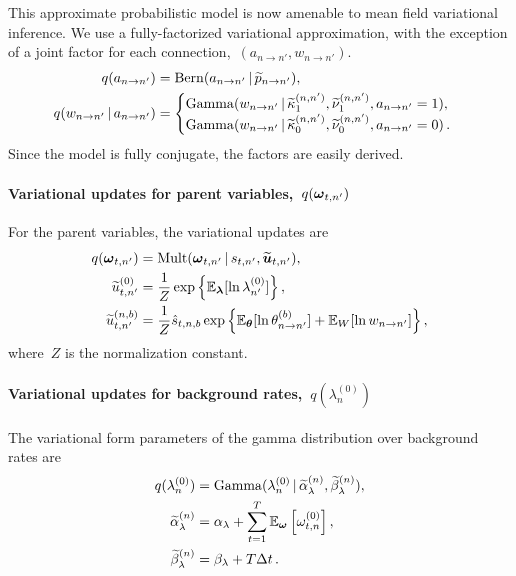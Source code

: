 This approximate probabilistic model is now amenable to mean field
variational inference. We use a fully-factorized variational
approximation, with the exception of a joint factor for each
connection,~${(a_{n\to n'},w_{n \to n'})}$.
\begin{align*}
  q(a_{n \to n'}) &= \mathrm{Bern}(a_{n \to n'} \,|\, \widetilde{p}_{n \to n'}), \\
  q(w_{n \to n'} \,|\, a_{n \to n'}) &=
  \begin{cases} 
    \mathrm{Gamma}(w_{n \to n'} \,|\, \widetilde{\kappa}_1^{(n, n')}, \widetilde{\nu}_1^{(n,n')}, a_{n \to n'} =1), \\
    \mathrm{Gamma}(w_{n \to n'} \,|\, \widetilde{\kappa}_0^{(n, n')}, \widetilde{\nu}_0^{(n, n')}, a_{n \to n'} =0)\,.
  \end{cases}
\end{align*}
Since the model is fully conjugate, the factors are easily derived.

\paragraph{Variational updates for parent variables,~$q(\boldsymbol{\omega}_{t, n'})$} 
For the parent variables, the variational updates are
\begin{align*}
q(\boldsymbol{\omega}_{t,n'}) &= \mathrm{Mult}(\boldsymbol{\omega}_{t, n'} \,|\, s_{t,n'}, \widetilde{\boldsymbol{u}}_{t,n'}), \\
\widetilde{u}_{t,n'}^{(0)} &= \frac{1}{Z} \exp\left\{\mathbb{E}_{\boldsymbol{\lambda}}[\ln \lambda_{n'}^{(0)}]\right\}, \\
\widetilde{u}_{t,n'}^{(n,b)} &= \frac{1}{Z} \hat{s}_{t,n,b} \exp\left\{\mathbb{E}_{\boldsymbol{\theta}} [\ln \theta_{n \to n'}^{(b)}] + \mathbb{E}_W[\ln w_{n \to n'}]\right\},
\end{align*}
where~$Z$ is the normalization constant.

\paragraph{Variational updates for background rates,~$q(\lambda_n^{(0)})$}
The variational form parameters of the gamma distribution over
background rates are
\begin{align*}
q(\lambda_n^{(0)}) &= \mathrm{Gamma}(\lambda_n^{(0)} \,|\, \widetilde{\alpha}_{\lambda}^{(n)}, \widetilde{\beta}_{\lambda}^{(n)}),  \\
\widetilde{\alpha}_{\lambda}^{(n)} &= \alpha_\lambda + \sum_{t=1}^T \mathbb{E}_{\boldsymbol{\omega}}\left[ \omega_{t,n}^{(0)}\right], \\
\widetilde{\beta}_{\lambda}^{(n)} &= \beta_\lambda + T \Delta t\,.
\end{align*}


